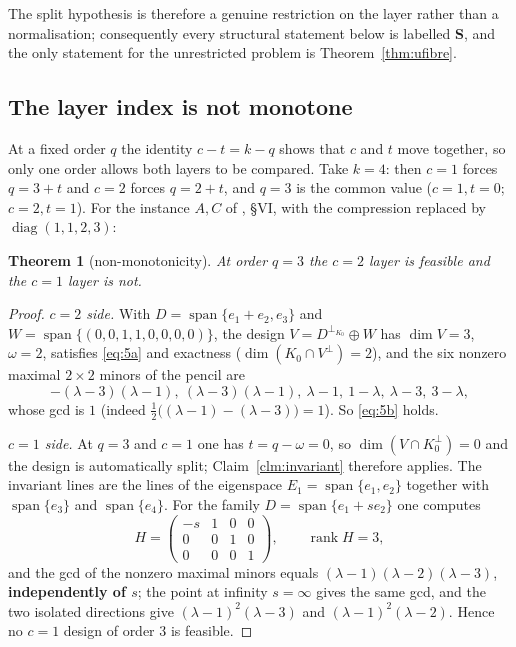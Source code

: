 \documentclass[journal]{IEEEtran}
\theoremstyle{plainn}
\newtheorem{thm}{Theorem}
\theoremstyle{remark}
\newcommand{\rank}{\operatorname{rank}}
\begin{document}
The split hypothesis is therefore a genuine restriction on the layer rather than a normalisation;
consequently every structural statement below is labelled \textbf{S}, and the only statement for the
unrestricted problem is Theorem~\ref{thm:ufibre}.

\subsection{The layer index is not monotone}\label{sec:layers:c}

At a fixed order $q$ the identity $c-t=k-q$ shows that $c$ and $t$ move together, so only one order
allows both layers to be compared. Take $k=4$: then $c=1$ forces $q=3+t$ and $c=2$ forces $q=2+t$, and
$q=3$ is the common value ($c=1,t=0$; $c=2,t=1$). For the instance $A,C$ of \cite{companion3}, \S VI,
with the compression replaced by $\operatorname{diag}(1,1,2,3)$:

\begin{thm}[non-monotonicity]\label{thm:nonmono}
At order $q=3$ the $c=2$ layer is feasible and the $c=1$ layer is not.
\end{thm}

\begin{proof}
\emph{$c=2$ side.} With $D=\operatorname{span}\{e_1+e_2,e_3\}$ and
$W=\operatorname{span}\{(0,0,1,1,0,0,0,0)\}$, the design $V=D^{\perp_{K_0}}\oplus W$ has $\dim V=3$,
$\omega=2$, satisfies \eqref{eq:5a} and exactness ($\dim(K_0\cap V^\perp)=2$), and the six nonzero maximal
$2\times2$ minors of the pencil are
\[
-(\lambda-3)(\lambda-1),\ (\lambda-3)(\lambda-1),\ \lambda-1,\ 1-\lambda,\ \lambda-3,\ 3-\lambda,
\]
whose gcd is $1$ (indeed $\tfrac12\bigl((\lambda-1)-(\lambda-3)\bigr)=1$). So \eqref{eq:5b} holds.

\emph{$c=1$ side.} At $q=3$ and $c=1$ one has $t=q-\omega=0$, so $\dim(V\cap K_0^\perp)=0$ and the design
is automatically split; Claim~\ref{clm:invariant} therefore applies. The invariant lines are the lines of
the eigenspace $E_1=\operatorname{span}\{e_1,e_2\}$ together with $\operatorname{span}\{e_3\}$ and
$\operatorname{span}\{e_4\}$. For the family $D=\operatorname{span}\{e_1+se_2\}$ one computes
\[
H=\begin{pmatrix}-s&1&0&0\\0&0&1&0\\0&0&0&1\end{pmatrix},\qquad \rank H=3,
\]
and the gcd of the nonzero maximal minors equals $(\lambda-1)(\lambda-2)(\lambda-3)$,
\textbf{independently of $s$}; the point at infinity $s=\infty$ gives the same gcd, and the two isolated
directions give $(\lambda-1)^2(\lambda-3)$ and $(\lambda-1)^2(\lambda-2)$. Hence no $c=1$ design of order
$3$ is feasible.
\end{proof}
\end{document}
